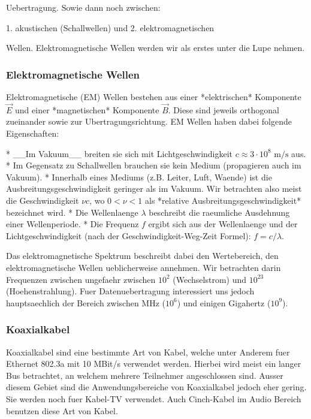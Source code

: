 Uebertragung. Sowie dann noch zwischen:

1. akustischen (Schallwellen) und
2. elektromagnetischen

Wellen. Elektromagnetische Wellen werden wir als erstes unter die Lupe nehmen.

\subsubsection{ Elektromagnetische Wellen}

Elektromagnetische (EM) Wellen bestehen aus einer *elektrischen* Komponente
$\vec{E}$ und einer *magnetischen* Komponente $\vec{B}$. Diese sind jeweils
orthogonal zueinander sowie zur Ubertragungsrichtung. EM Wellen haben dabei
folgende Eigenschaften:

* \_\_Im Vakuum\_\_ breiten sie sich mit Lichtgeschwindigkeit $c \approx 3 \cdot 10^8 \text{ m/s}$ aus.
* Im Gegensatz zu Schallwellen brauchen sie kein Medium (propagieren auch im
  Vakuum).
* Innerhalb eines Mediums (z.B. Leiter, Luft, Waende) ist die
  Ausbreitungsgeschwindigkeit geringer als im Vakuum. Wir betrachten also meist
  die Geschwindigkeit $\nu c$, wo $0 < \nu < 1$ als *relative
  Ausbreitungsgeschwindigkeit* bezeichnet wird.
* Die Wellenlaenge $\lambda$ beschreibt die raeumliche Ausdehnung einer
  Wellenperiode.
* Die Frequenz $f$ ergibt sich aus der Wellenlaenge und der Lichtgeschwindigkeit
  (nach der Geschwindigkeit-Weg-Zeit Formel): $f = c/\lambda$.

Das elektromagnetische Spektrum beschreibt dabei den Wertebereich, den elektromagnetische Wellen ueblicherweise annehmen. Wir betrachten darin Frequenzen zwischen ungefaehr zwischen $10^2$ (Wechselstrom) und $10^{23}$ (Hoehenstrahlung). Fuer Datenuebertragung interessiert uns jedoch hauptsaechlich der Bereich zwischen MHz ($10^6$) und einigen Gigahertz ($10^9$).

\subsubsection{ Koaxialkabel}

Koaxialkabel sind eine bestimmte Art von Kabel, welche unter Anderem fuer
Ethernet 802.3a mit 10 MBit/s verwendet werden. Hierbei wird meist ein langer
Bus betrachtet, an welchem mehrere Teilnehmer angeschlossen sind. Ausser diesem
Gebiet sind die Anwendungsbereiche von Koaxialkabel jedoch eher gering. Sie
werden noch fuer Kabel-TV verwendet. Auch Cinch-Kabel im Audio Bereich benutzen
diese Art von Kabel.


